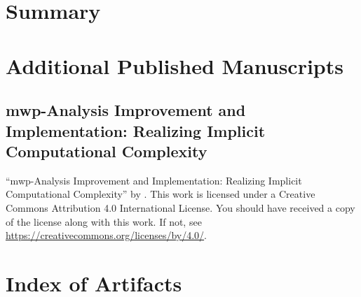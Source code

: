 \chapter{Summary}\label{ch:summary}
\clearpage\newsectoff\newsect

\printbibliography[label=chap:references,
    title=References, heading=bibnumbered, check=mynocite]

\appendix
\continousappendix

\chapter{Additional Published Manuscripts}\label{app:additional-manuscripts}

    \section{mwp-Analysis Improvement and Implementation: Realizing Implicit
    Computational Complexity}\label{sec:fscd}
    \pageIconAnalysis
    {\par\enquote{mwp-Analysis Improvement and Implementation: Realizing
    Implicit Computational Complexity}
    \textcopyright{ }by{ }\CTNT.
    \newline{}This work is licensed under a Creative Commons Attribution 4.0
    International License.
    \newline{}You should have received a copy of the license along with this work.
    \newline{}If not, see \url{https://creativecommons.org/licenses/by/4.0/}.}
    
    \clearpage

\chapter{Index of Artifacts}\label{app:sec:artifacts}

\clearpage

